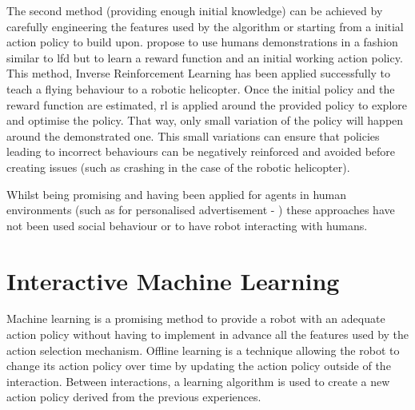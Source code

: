 	The second method (providing enough initial knowledge) can be achieved by carefully engineering the features used by the algorithm or starting from a initial action policy to build upon. \cite{Abbeel2004} propose to use humans demonstrations in a fashion similar to \gls{lfd} but to learn a reward function and an initial working action policy. This method, Inverse Reinforcement Learning has been applied successfully to teach a flying behaviour to a robotic helicopter. Once the initial policy and the reward function are estimated, \gls{rl} is applied around the provided policy to explore and optimise the policy. That way, only small variation of the policy will happen around the demonstrated one. This small variations can ensure that policies leading to incorrect behaviours can be negatively reinforced and avoided before creating issues (such as crashing in the case of the robotic helicopter).
	
	
	Whilst being promising and having been applied for agents in human environments (such as for personalised advertisement - \citealt{theocharous2015personalized})	these approaches have not been used social behaviour or to have robot interacting with humans.

\section{Interactive Machine Learning} \label{sec:back_iml}

Machine learning is a promising method to provide a robot with an adequate action policy without having to implement in advance all the features used by the action selection mechanism. Offline learning is a technique allowing the robot to change its action policy over time by updating the action policy outside of the interaction. Between interactions, a learning algorithm is used to create a new action policy derived from the previous experiences.

